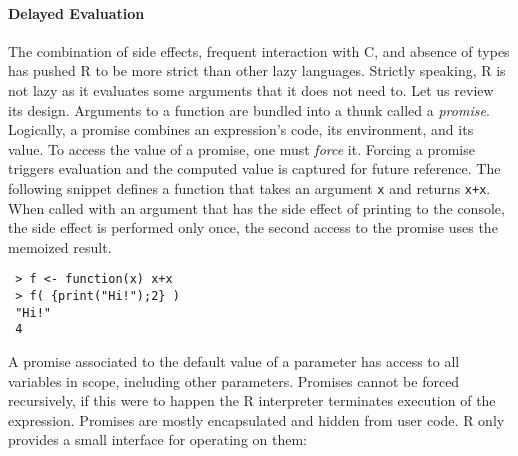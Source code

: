 \documentclass[review,screen,acmsmall]{acmart}
\renewcommand{\c}[1]{\lstinline |#1|\xspace}
\begin{document}
\paragraph{Delayed Evaluation}
The combination of side effects, frequent interaction with C, and absence of
types has pushed R to be more strict than other lazy languages. Strictly
speaking, R is not lazy as it evaluates some arguments that it does not need to.
Let us review its design. Arguments to a function are bundled into a thunk
called a \emph{promise}. Logically, a promise combines an expression's code, its
environment, and its value. To access the value of a promise, one must
\emph{force} it. Forcing a promise triggers evaluation and the computed value is
captured for future reference. The following snippet defines a function that
takes an argument \c x and returns \c{x+x}. When called with an argument
that has the side effect of printing to the console, the side effect is
performed only once, the second access to the promise uses the memoized result.

\begin{lstlisting}
 > f <- function(x) x+x
 > f( {print("Hi!");2} )
 "Hi!"
 4
\end{lstlisting}


A promise associated to the default value of a parameter has access to all
variables in scope, including other parameters. Promises cannot be forced
recursively, if this were to happen the R interpreter terminates execution of
the expression. Promises are mostly encapsulated and hidden from user code. R
only provides a small interface for operating on them:
\end{document}
